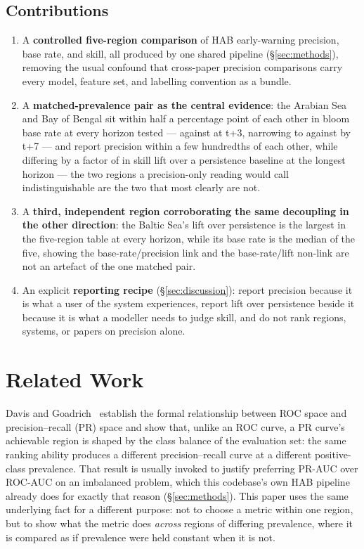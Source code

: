 \subsection{Contributions}

\begin{enumerate}\itemsep2pt
\item A \textbf{controlled five-region comparison} of HAB early-warning
precision, base rate, and skill, all produced by one shared pipeline
(\S\ref{sec:methods}), removing the usual confound that cross-paper
precision comparisons carry every model, feature set, and labelling
convention as a bundle.
\item A \textbf{matched-prevalence pair as the central evidence}: the
Arabian Sea and Bay of Bengal sit within half a percentage point of each
other in bloom base rate at every horizon tested ---
\HabArabianBaseThree{} against \HabBengalBaseThree{} at t+3, narrowing to
\HabArabianBaseSeven{} against \HabBengalBaseSeven{} by t+7 --- and report
precision within a few hundredths of each other, while differing by a
factor of \HabLiftRatioSeven{} in skill lift over a persistence baseline at
the longest horizon --- the two regions a precision-only reading would call
indistinguishable are the two that most clearly are not.
\item A \textbf{third, independent region corroborating the same
decoupling in the other direction}: the Baltic Sea's lift over persistence
is the largest in the five-region table at every horizon, while its base
rate is the median of the five, showing the base-rate/precision link and the
base-rate/lift non-link are not an artefact of the one matched pair.
\item An explicit \textbf{reporting recipe} (\S\ref{sec:discussion}):
report precision because it is what a user of the system experiences, report
lift over persistence beside it because it is what a modeller needs to judge
skill, and do not rank regions, systems, or papers on precision alone.
\end{enumerate}

\section{Related Work}
\label{sec:related}

Davis and Goadrich~\citep{davis2006} establish the formal relationship
between ROC space and precision--recall (PR) space and show that, unlike an
ROC curve, a PR curve's achievable region is shaped by the class balance of
the evaluation set: the same ranking ability produces a different
precision--recall curve at a different positive-class prevalence. That
result is usually invoked to justify preferring PR-AUC over ROC-AUC on an
imbalanced problem, which this codebase's own HAB pipeline already does for
exactly that reason (\S\ref{sec:methods}). This paper uses the same
underlying fact for a different purpose: not to choose a metric within one
region, but to show what the metric does \emph{across} regions of differing
prevalence, where it is compared as if prevalence were held constant when it
is not.


